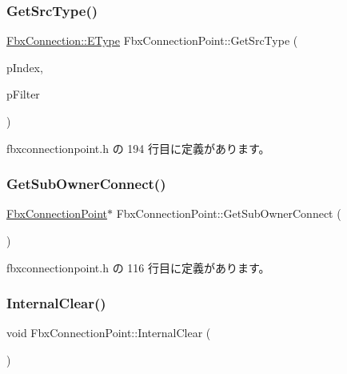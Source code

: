 \subsubsection{\texorpdfstring{Get\+Src\+Type()}{GetSrcType()}\hspace{0.1cm}{\footnotesize\ttfamily [2/2]}}
{\footnotesize\ttfamily \hyperlink{class_fbx_connection_a3df448a5db356652ab99fd2be2553749}{Fbx\+Connection\+::\+E\+Type} Fbx\+Connection\+Point\+::\+Get\+Src\+Type (\begin{DoxyParamCaption}\item[{int}]{p\+Index,  }\item[{\hyperlink{class_fbx_connection_point_filter}{Fbx\+Connection\+Point\+Filter} $\ast$}]{p\+Filter }\end{DoxyParamCaption})\hspace{0.3cm}{\ttfamily [inline]}}



 fbxconnectionpoint.\+h の 194 行目に定義があります。

\mbox{\label{class_fbx_connection_point_a783e065e921f1e5e7b05b8108a450fb0}} 
\subsubsection{\texorpdfstring{Get\+Sub\+Owner\+Connect()}{GetSubOwnerConnect()}}
{\footnotesize\ttfamily \hyperlink{class_fbx_connection_point}{Fbx\+Connection\+Point}$\ast$ Fbx\+Connection\+Point\+::\+Get\+Sub\+Owner\+Connect (\begin{DoxyParamCaption}{ }\end{DoxyParamCaption})\hspace{0.3cm}{\ttfamily [inline]}}



 fbxconnectionpoint.\+h の 116 行目に定義があります。

\mbox{\label{class_fbx_connection_point_aadd7e4cb8e392a559373c72411df55bb}} 
\subsubsection{\texorpdfstring{Internal\+Clear()}{InternalClear()}}
{\footnotesize\ttfamily void Fbx\+Connection\+Point\+::\+Internal\+Clear (\begin{DoxyParamCaption}{ }\end{DoxyParamCaption})}

